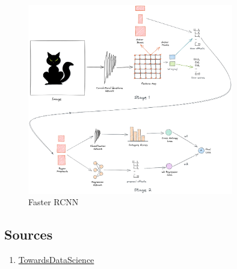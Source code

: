 \begin{figure}[H]
  \centering
  \includegraphics[width=0.8\textwidth]{images/faster_r_cnn/structure.png}
  \caption{Faster RCNN}
  \label{fig:faster_r_cnn_structure}
\end{figure}

\subsection{Sources}

\begin{enumerate}
  \item \href{https://towardsdatascience.com/understanding-and-implementing-faster-r-cnn-a-step-by-step-guide-11acfff216b0}{TowardsDataScience}
\end{enumerate}
